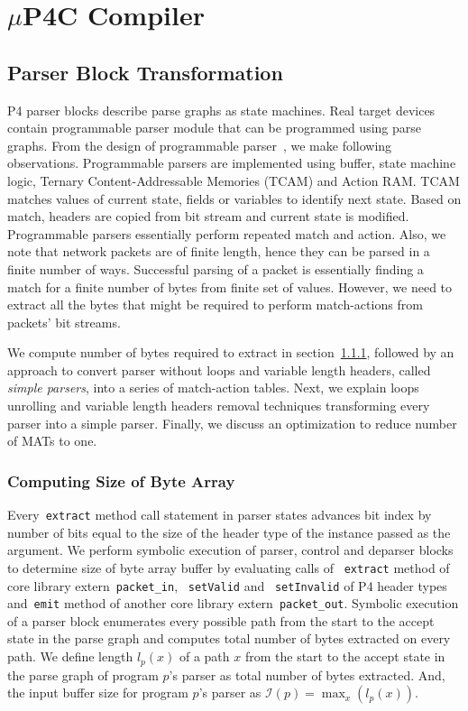 \section{$\mu$P4C Compiler}
\label{section-mp4c-compiler}


\subsection{Parser Block Transformation}
\label{subsection:parser-block-transformation}
P4 parser blocks describe parse graphs as state machines.
Real target devices contain programmable parser module that can be programmed using parse graphs.
From the design of programmable parser~\cite{6665172}, we make following observations.
Programmable parsers are implemented using buffer, state machine logic, Ternary Content-Addressable Memories (TCAM) and Action RAM. 
TCAM matches values of current state, fields or variables to identify next state. 
Based on match, headers are copied from bit stream and current state is modified.
Programmable parsers essentially perform repeated match and action.
Also, we note that network packets are of finite length, hence they can be parsed in a finite number of ways.
Successful parsing of a packet is essentially finding a match for a finite number of bytes from finite set of values.
However, we need to extract all the bytes that might be required to perform match-actions from packets' bit streams.


We compute number of bytes required to extract in section~\ref{subsubsection:computing-size-of-byte-array}, followed by an approach to convert parser without loops and variable length headers, called \textit{simple parsers}, into a series of match-action tables.
Next, we explain loops unrolling and variable length headers removal techniques transforming every parser into a simple parser.
Finally, we discuss an optimization to reduce number of MATs to one.


\subsubsection{Computing Size of Byte Array}
\label{subsubsection:computing-size-of-byte-array}
Every~\texttt{extract} method call statement in parser states advances bit index by number of bits equal to the size of the header type of the instance passed as the argument.
We perform symbolic execution of parser, control and deparser blocks to determine size of byte array buffer by evaluating calls of ~\texttt{extract} method of core library extern~\texttt{packet\_in}, ~\texttt{setValid} and ~\texttt{setInvalid} of P4 header types and~\texttt{emit} method of another core library extern~\texttt{packet\_out}.
Symbolic execution of a parser block enumerates every possible path from the start to the accept state in the parse graph and computes total number of bytes extracted on every path.
We define length $l_{p}(x)$ of a path $x$ from the start to the accept state in the parse graph of program $p$'s parser as total number of bytes extracted.
And, the input buffer size for program $p$'s parser as $\mathcal{I}(p) = \max_{x}(l_{p}(x))$. 



